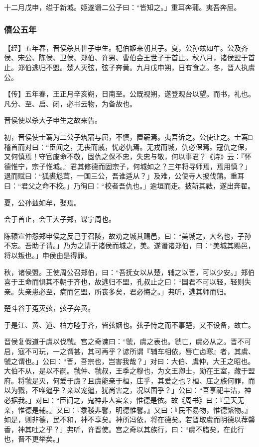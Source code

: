 \documentclass[]{article}
\begin{document}
十二月戊申，缢于新城。姬遂谮二公子曰：``皆知之。」重耳奔蒲。夷吾奔屈。

\hypertarget{header-n692}{%
\subsubsection{僖公五年}\label{header-n692}}

【经】五年春，晋侯杀其世子申生。杞伯姬来朝其子。夏，公孙兹如牟。公及齐侯、宋公、陈侯、卫侯、郑伯、许男、曹伯会王世子于首止。秋八月，诸侯盟于首止。郑伯逃归不盟。楚人灭弦，弦子奔黄。九月戊申朔，日有食之。冬，晋人执虞公。

【传】五年春，王正月辛亥朔，日南至。公既视朔，遂登观台以望。而书，礼也。凡分、至、启、闭，必书云物，为备故也。

晋侯使以杀大子申生之故来告。

初，晋侯使士蒍为二公子筑蒲与屈，不慎，置薪焉。夷吾诉之。公使让之。士蒍□稽首而对曰：``臣闻之，无丧而戚，忧必仇焉。无戎而城，仇必保焉。寇仇之保，又何慎焉！守官废命不敬，固仇之保不忠，失忠与敬，何以事君？《诗》云：『怀德惟宁，宗子惟城。』君其修德而固宗子，何城如之？三年将寻师焉，焉用慎？」退而赋曰：``狐裘尨茸，一国三公，吾谁适从？」及难，公使寺人披伐蒲。重耳曰：``君父之命不校。」乃徇曰：``校者吾仇也。」逾垣而走。披斩其祛，遂出奔翟。

夏，公孙兹如牟，娶焉。

会于首止，会王大子郑，谋宁周也。

陈辕宣仲怨郑申侯之反己于召陵，故劝之城其赐邑，曰：``美城之，大名也，子孙不忘。吾助子请。」乃为之请于诸侯而城之，美。遂谮诸郑伯，曰：``美城其赐邑，将以叛也。」申侯由是得罪。

秋，诸侯盟。王使周公召郑伯，曰：``吾抚女以从楚，辅之以晋，可以少安。」郑伯喜于王命而惧其不朝于齐也，故逃归不盟，孔叔止之曰：``国君不可以轻，轻则失亲。失亲患必至，病而乞盟，所丧多矣，君必悔之。」弗听，逃其师而归。

楚斗谷于菟灭弦，弦子奔黄。

于是江、黄、道、柏方睦于齐，皆弦姻也。弦子恃之而不事楚，又不设备，故亡。

晋侯复假道于虞以伐虢。宫之奇谏曰：``虢，虞之表也。虢亡，虞必从之。晋不可启，寇不可玩，一之谓甚，其可再乎？谚所谓『辅车相依，唇亡齿寒』者，其虞、虢之谓也。」公曰：``晋，吾宗也，岂害我哉？」对曰：大伯、虞仲，大王之昭也。大伯不从，是以不嗣。虢仲、虢叔，王季之穆也，为文王卿士，勋在王室，藏于盟府。将虢是灭，何爱于虞？且虞能亲于桓，庄乎，其爱之也？桓、庄之族何罪，而以为戮，不唯逼乎？亲以宠逼，犹尚害之，况以国乎？」公曰：``吾享祀丰洁，神必据我。」对曰：``臣闻之，鬼神非人实亲，惟德是依。故《周书》曰：『皇天无亲，惟德是辅。』又曰：『黍稷非馨，明德惟馨。』又曰：『民不易物，惟德繄物。』如是，则非德，民不和，神不享矣。神所冯依，将在德矣。若晋取虞而明德以荐馨香，神其吐之乎？」弗听，许晋使。宫之奇以其族行，曰：``虞不腊矣，在此行也，晋不更举矣。」
\end{document}
